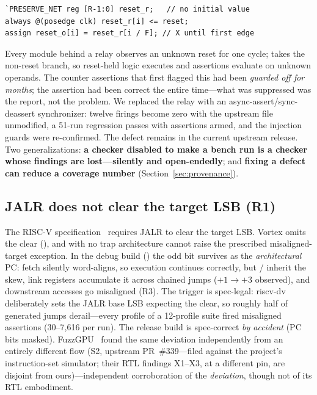 \documentclass[conference]{IEEEtran}
\newcommand{\code}[1]{\texttt{\detokenize{#1}}}
\begin{document}
\begin{lstlisting}
`PRESERVE_NET reg [R-1:0] reset_r;   // no initial value
always @(posedge clk) reset_r[i] <= reset;
assign reset_o[i] = reset_r[i / F]; // X until first edge
\end{lstlisting}

Every module behind a relay observes an unknown reset for one cycle;
\code{if (X)} takes the non-reset branch, so reset-held logic executes
and assertions evaluate on unknown operands. The counter assertions
that first flagged this had been \emph{guarded off for months}; the
assertion had been correct the entire time---what was suppressed was
the report, not the problem. We replaced the relay with an
async-assert/sync-deassert synchronizer: twelve firings become zero
with the upstream file unmodified, a 51-run regression passes with
assertions armed, and the injection guards were re-confirmed. The
defect remains in the current upstream release. Two generalizations:
\textbf{a checker disabled to make a bench run is a checker whose
	findings are lost---silently and open-endedly}; and \textbf{fixing a
	defect can reduce a coverage number} (Section~\ref{sec:provenance}).

\subsection{JALR does not clear the target LSB (R1)}
The RISC-V specification~\cite{riscv-spec} requires JALR to clear the
target LSB. Vortex omits the clear (\code{VX_alu_int.sv:222}), and with
no trap architecture cannot raise the prescribed misaligned-target
exception. In the debug build (\code{PC_BITS=XLEN}) the odd bit
survives as the \emph{architectural} PC: fetch silently word-aligns, so
execution continues correctly, but \code{auipc}/\code{la} inherit the
skew, link registers accumulate it across chained jumps ($+1 \to +3$
observed), and downstream accesses go misaligned (R3). The trigger is
spec-legal: riscv-dv deliberately sets the JALR base LSB expecting the
clear, so roughly half of generated jumps derail---every profile of a
12-profile suite fired misaligned assertions (30--7{,}616 per run). The
release build is spec-correct \emph{by accident} (PC bits masked).
FuzzGPU~\cite{fuzzgpu} found the same deviation independently from an
entirely different flow (S2, upstream PR~\#339---filed against the
project's instruction-set simulator; their RTL findings X1--X3, at a
different pin, are disjoint from ours)---independent corroboration of
the \emph{deviation}, though not of its RTL embodiment.
\end{document}
